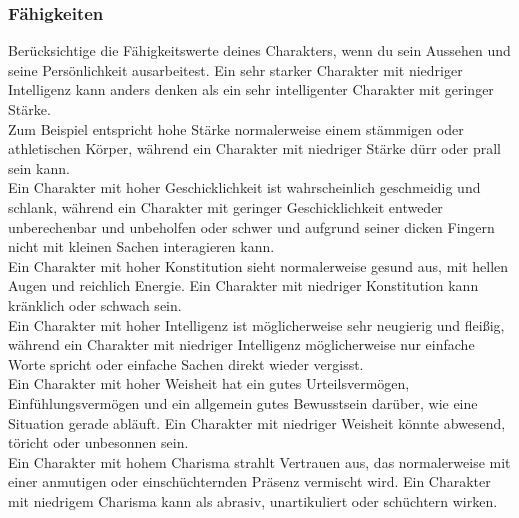 \subsubsection{Fähigkeiten}
Berücksichtige die Fähigkeitswerte deines Charakters, wenn du sein Aussehen und seine Persönlichkeit ausarbeitest. Ein sehr starker Charakter mit niedriger Intelligenz kann anders denken als ein sehr intelligenter Charakter mit geringer Stärke.\\
Zum Beispiel entspricht hohe Stärke normalerweise einem stämmigen oder athletischen Körper, während ein Charakter mit niedriger Stärke dürr oder prall sein kann.\\
Ein Charakter mit hoher Geschicklichkeit ist wahrscheinlich geschmeidig und schlank, während ein Charakter mit geringer Geschicklichkeit entweder unberechenbar und unbeholfen oder schwer und aufgrund seiner dicken Fingern nicht mit kleinen Sachen interagieren kann.\\
Ein Charakter mit hoher Konstitution sieht normalerweise gesund aus, mit hellen Augen und reichlich Energie. Ein Charakter mit niedriger Konstitution kann kränklich oder schwach sein.\\
Ein Charakter mit hoher Intelligenz ist möglicherweise sehr neugierig und fleißig, während ein Charakter mit niedriger Intelligenz möglicherweise nur einfache Worte spricht oder einfache Sachen direkt wieder vergisst.\\
Ein Charakter mit hoher Weisheit hat ein gutes Urteilsvermögen, Einfühlungsvermögen und ein allgemein gutes Bewusstsein darüber, wie eine Situation gerade abläuft. Ein Charakter mit niedriger Weisheit könnte abwesend, töricht oder unbesonnen sein.\\
Ein Charakter mit hohem Charisma strahlt Vertrauen aus, das normalerweise mit einer anmutigen oder einschüchternden Präsenz vermischt wird. Ein Charakter mit niedrigem Charisma kann als abrasiv, unartikuliert oder schüchtern wirken.

